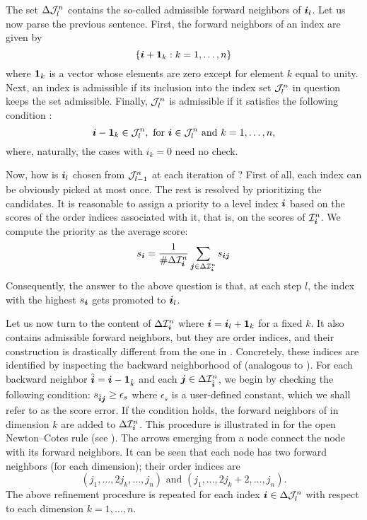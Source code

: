 The set $\Delta\mathcal{J}^{n}_{l}$ contains the so-called admissible forward
neighbors of $\boldsymbol{i}_l$. Let us now parse the previous sentence. First, the forward
neighbors of an index \vi are given by
\[
  \left\{ \boldsymbol{i} + \boldsymbol{1}_k: k = 1, \dots, n \right\}
\]
where $\boldsymbol{1}_k$ is a vector whose elements are zero except for element $k$ equal
to unity. Next, an index \vi is admissible if its inclusion into the index set
$\mathcal{J}^{n}_{l}$ in question keeps the set admissible. Finally,
$\mathcal{J}^{n}_{l}$ is admissible if it satisfies the following condition
\cite{klimke2006}:
\[
  \boldsymbol{i} - \boldsymbol{1}_k \in \mathcal{J}^{n}_{l}, \text{ for $\boldsymbol{i} \in \mathcal{J}^{n}_{l}$ and $k = 1, \dots, n$,}
\]
where, naturally, the cases with $i_k = 0$ need no check.

Now, how is $\boldsymbol{i}_l$ chosen from $\mathcal{J}^{n}_{l - 1}$ at each iteration of
? First of all, each index can be obviously picked at most
once. The rest is resolved by prioritizing the candidates. It is reasonable to
assign a priority to a level index $\boldsymbol{i}$ based on the scores of the order
indices associated with it, that is, on the scores of $\mathcal{I}^{n}_{\boldsymbol{i}}$. We
compute the priority as the average score:
\[
  s_{\boldsymbol{i}} = \frac{1}{\# \Delta\mathcal{I}^{n}_{\boldsymbol{i}}} \sum_{\boldsymbol{j} \in \Delta\mathcal{I}^{n}_{\boldsymbol{i}}} s_{\boldsymbol{i} \boldsymbol{j}}
\]
Consequently, the answer to the above question is that, at each step $l$, the
index \vi with the highest $s_{\boldsymbol{i}}$ gets promoted to $\boldsymbol{i}_l$.

Let us now turn to the content of $\Delta\mathcal{I}^{n}_{\boldsymbol{i}}$ where $\boldsymbol{i} =
\boldsymbol{i}_l + \boldsymbol{1}_k$ for a fixed $k$. It also contains admissible forward neighbors,
but they are order indices, and their construction is drastically different from
the one in . Concretely, these indices are
identified by inspecting the backward neighborhood of \vi (analogous to
). For each backward neighbor $\hat{\boldsymbol{i}} = \boldsymbol{i} -
\boldsymbol{1}_{\hat{k}}$ and each $\boldsymbol{j} \in \Delta\mathcal{I}^{n}_{\hat{\boldsymbol{i}}}$, we begin
by checking the following condition: $s_{\hat{\boldsymbol{i}} \boldsymbol{j}} \geq \epsilon_s$ where
$\epsilon_s$ is a user-defined constant, which we shall refer to as the score
error. If the condition holds, the forward neighbors of \vj in dimension $k$ are
added to $\Delta\mathcal{I}^{n}_{\boldsymbol{i}}$. This procedure is illustrated in
 for the open Newton--Cotes rule (see ). The arrows
emerging from a node connect the node with its forward neighbors. It can be seen
that each node has two forward neighbors (for each dimension); their order
indices are
\[
  (j_1, \dots, 2 j_k, \dots, j_n) \text{ and } (j_1, \dots, 2 j_k + 2, \dots, j_n).
\]
The above refinement procedure is repeated for each index $\boldsymbol{i} \in
\Delta\mathcal{J}^{n}_{l}$ with respect to each dimension $k = 1, \dots, n$.

